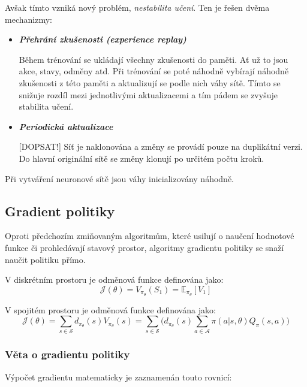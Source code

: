 Avšak tímto vzniká nový problém, \emph{nestabilita učení}.
Ten je řešen dvěma mechanizmy:

\begin{itemize}
  \item \textbf{\emph{Přehrání zkušenosti (experience replay)}}
  
  Během trénování se ukládají všechny zkušenosti do paměti.
  Ať už to jsou akce, stavy, odměny atd.
  Při trénování se poté náhodně vybírají náhodně zkušenosti z této paměti a aktualizují se podle nich váhy sítě.
  Tímto se snižuje rozdíl mezi jednotlivými aktualizacemi a tím pádem se zvyšuje stabilita učení.
  

  \item \textbf{\emph{Periodická aktualizace}}

  {\color{red}[DOPSAT!]}
  Síť je naklonována a změny se provádí pouze na duplikátní verzi.
  Do hlavní originální sítě se změny klonují po určitém počtu kroků.

\end{itemize}

Při vytváření neuronové sítě jsou váhy inicializovány náhodně.

\subsection{Gradient politiky}\label{subsec:gradient-politiky}
Oproti předchozím zmiňovaným algoritmům, které usilují o naučení hodnotové funkce či prohledávají stavový prostor, algoritmy gradientu politiky se snaží naučit politiku přímo.

V diskrétním prostoru je odměnová funkce definována jako:
\begin{equation}
  \label{eq:odmenova_funkce}
  \mathcal{J}(\theta) = V_{\pi_\theta}(S_1) = \mathbb{E}_{\pi_\theta}[V_1]
\end{equation}

V spojitém prostoru je odměnová funkce definována jako:
\begin{equation}
    \label{eq:odmenova_funkce_spojita}
  \mathcal{J}(\theta) = \sum_{s \in \mathcal{S}} d_{\pi_\theta}(s) V_{\pi_\theta}(s) = \sum_{s \in \mathcal{S}} \Big( d_{\pi_\theta}(s) \sum_{a \in \mathcal{A}} \pi(a \vert s, \theta) Q_\pi(s, a) \Big)
  \end{equation}

\subsubsection*{Věta o gradientu politiky}
Výpočet gradientu matematicky je zaznamenán touto rovnicí:

